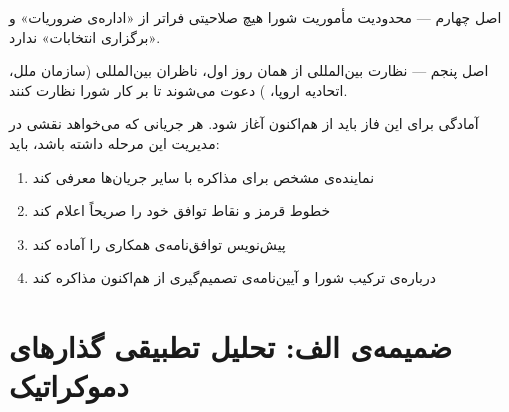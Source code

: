 \begin{center}
\end{center}



\begin{bandbox}{اصل چهارم --- محدودیت مأموریت}
شورا هیچ صلاحیتی فراتر از «اداره‌ی ضروریات» و «برگزاری انتخابات» ندارد.
\end{bandbox}

\begin{bandbox}{اصل پنجم --- نظارت بین‌المللی}
از همان روز اول، ناظران بین‌المللی (سازمان ملل، اتحادیه اروپا، ) دعوت
می‌شوند تا بر کار شورا نظارت کنند.
\end{bandbox}

\begin{notebox}[title={\rl{فراخوان به جریان‌های اپوزیسیون}}]
آمادگی برای این فاز باید از هم‌اکنون آغاز شود. هر جریانی که می‌خواهد نقشی در
مدیریت این مرحله داشته باشد، باید:
\begin{enumerate}
  \item نماینده‌ی مشخص برای مذاکره با سایر جریان‌ها معرفی کند
  \item خطوط قرمز و نقاط توافق خود را صریحاً اعلام کند
  \item پیش‌نویس توافق‌نامه‌ی همکاری را آماده کند
  \item درباره‌ی ترکیب شورا و آیین‌نامه‌ی تصمیم‌گیری از هم‌اکنون مذاکره کند
\end{enumerate}
\end{notebox}

\chapter{ضمیمه‌ی الف: تحلیل تطبیقی گذارهای دموکراتیک}
\label{app:comparative}

